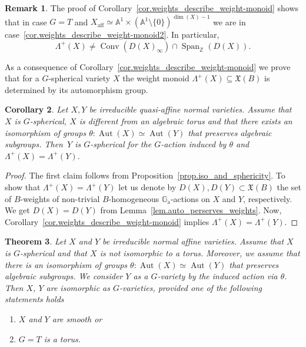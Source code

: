 \documentclass[JEP,XML,SOM,Unicode]{cedram}
\newcommand{\ra}{\mathrm{a}}
\theoremstyle{plain}
\newtheorem{theorem}{Theorem}[section]
\newtheorem{corollary}[theorem]{Corollary}
\theoremstyle{definition}
\newtheorem{remark}[theorem]{Remark}
\DeclareMathOperator{\Aut}{Aut}
\DeclareMathOperator{\aff}{aff}
\DeclareMathOperator{\Conv}{Conv}
\DeclareMathOperator{\Span}{Span}
\newcommand{\GG}{\mathbb{G}}
\newcommand{\ZZ}{\mathbb{Z}}
\renewcommand{\AA}{\mathbb{A}}
\begin{document}
\begin{remark}
\label{rem.special_case}
The proof of Corollary~\ref{cor.weights_describe_weight-monoid} shows that
in case $G = T$ and $X_{\aff} \simeq \AA^1 \times (\AA^1 \setminus \{0\})^{\dim(X)-1}$
we are in case~\ref{cor.weights_describe_weight-monoid2}. In particular,
\[
\Lambda^+(X) \neq \Conv ( D(X)_{\infty}) \cap \Span_{\ZZ}(D(X)).
\]
\end{remark}

As a consequence of Corollary~\ref{cor.weights_describe_weight-monoid} we prove that
for a $G$-spherical variety $X$ the weight monoid $\Lambda^+(X) \subseteq \mathfrak{X}(B)$
is determined by its automorphism group.

\begin{corollary}\label{thesameweights}
\label{cor.Autos_describe_weight_monoids}
Let $X, Y$ be irreducible quasi-affine normal varieties. Assume that~$X$ is $G$-spherical, $X$ is different from an algebraic torus and that
there exists an isomorphism of groups
$\theta \colon \Aut(X) \simeq \Aut(Y)$ that preserves
algebraic subgroups.
Then~$Y$ is $G$-spherical for the $G$-action induced by $\theta$
and $\Lambda^+(X) = \Lambda^+(Y)$.
\end{corollary}

\begin{proof}
The first claim follows from Proposition~\ref{prop.iso_and_sphericity}.
To show that $\Lambda^+(X) = \Lambda^+(Y)$ let us denote by
$D(X), D(Y) \subset \mathfrak{X}(B)$ the set of $B$-weights of non-trivial $B$-homo\-geneous $\GG_\ra$-actions
on $X$ and $Y$, respectively. We get $D(X) = D(Y)$ from Lemma~\ref{lem.auto_perserves_weights}.
Now, Corollary~\ref{cor.weights_describe_weight-monoid} implies $\Lambda^+(X) = \Lambda^+(Y)$.
\end{proof}

\begin{theorem}
\label{thm.smooth_spherical_var}
Let $X$ and $Y$ be irreducible normal affine varieties. Assume that
$X$ is $G$-spherical and that $X$ is not isomorphic
to a torus. Moreover, we assume that there is an isomorphism of groups
$\theta \colon \Aut(X) \simeq \Aut(Y)$ that preserves
algebraic subgroups. We consider $Y$ as a $G$-variety by the induced action via $\theta$. Then
$X$, $Y$ are isomorphic as $G$-varieties, provided one of the following statements holds
\begin{enumerate}\renewcommand{\theenumi}{\alph{enumi}}
\item \label{thm.smooth_spherical_var_cond_a} $X$ and $Y$ are smooth or
\item \label{thm.smooth_spherical_var_cond_b} $G = T$ is a torus.
\end{enumerate}
\end{theorem}
\end{document}
